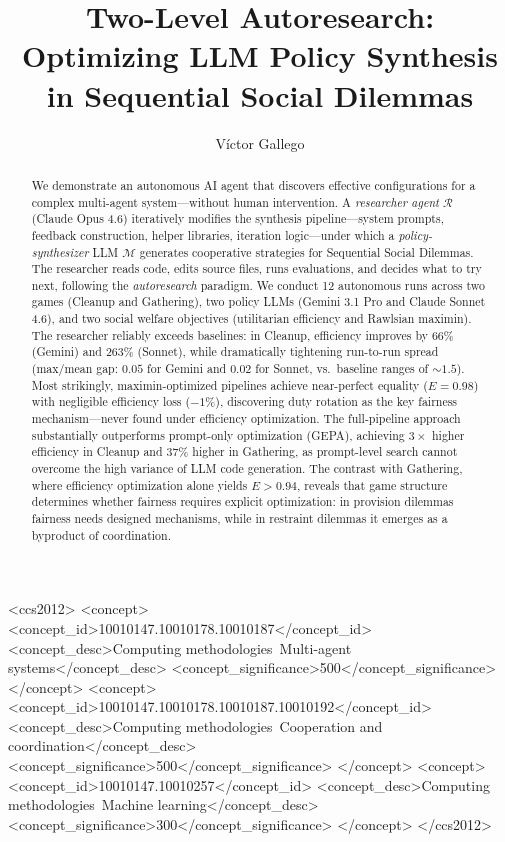 \documentclass[sigconf,authordraft]{acmart}
\newcommand{\cR}{\mathcal{R}}
\newcommand{\cM}{\mathcal{M}}
\begin{document}
\title{Two-Level Autoresearch: Optimizing LLM Policy Synthesis in Sequential Social Dilemmas}

\author{V\'ictor Gallego}

\renewcommand{\shortauthors}{Gallego}

\begin{abstract}
We demonstrate an autonomous AI agent that discovers effective configurations for a complex multi-agent system---without human intervention. A \emph{researcher agent} $\cR$ (Claude Opus 4.6) iteratively modifies the synthesis pipeline---system prompts, feedback construction, helper libraries, iteration logic---under which a \emph{policy-synthesizer} LLM $\cM$ generates cooperative strategies for Sequential Social Dilemmas. The researcher reads code, edits source files, runs evaluations, and decides what to try next, following the \emph{autoresearch} paradigm. We conduct 12 autonomous runs across two games (Cleanup and Gathering), two policy LLMs (Gemini 3.1 Pro and Claude Sonnet 4.6), and two social welfare objectives (utilitarian efficiency and Rawlsian maximin). The researcher reliably exceeds baselines: in Cleanup, efficiency improves by 66\% (Gemini) and 263\% (Sonnet), while dramatically tightening run-to-run spread (max/mean gap: $0.05$ for Gemini and $0.02$ for Sonnet, vs.\ baseline ranges of ${\sim}1.5$). Most strikingly, maximin-optimized pipelines achieve near-perfect equality ($E{=}0.98$) with negligible efficiency loss ($-1\%$), discovering duty rotation as the key fairness mechanism---never found under efficiency optimization. The full-pipeline approach substantially outperforms prompt-only optimization (GEPA), achieving $3{\times}$ higher efficiency in Cleanup and $37\%$ higher in Gathering, as prompt-level search cannot overcome the high variance of LLM code generation. The contrast with Gathering, where efficiency optimization alone yields $E{>}0.94$, reveals that game structure determines whether fairness requires explicit optimization: in provision dilemmas fairness needs designed mechanisms, while in restraint dilemmas it emerges as a byproduct of coordination.
\end{abstract}

\begin{CCSXML}
<ccs2012>
 <concept>
  <concept_id>10010147.10010178.10010187</concept_id>
  <concept_desc>Computing methodologies~Multi-agent systems</concept_desc>
  <concept_significance>500</concept_significance>
 </concept>
 <concept>
  <concept_id>10010147.10010178.10010187.10010192</concept_id>
  <concept_desc>Computing methodologies~Cooperation and coordination</concept_desc>
  <concept_significance>500</concept_significance>
 </concept>
 <concept>
  <concept_id>10010147.10010257</concept_id>
  <concept_desc>Computing methodologies~Machine learning</concept_desc>
  <concept_significance>300</concept_significance>
 </concept>
</ccs2012>
\end{CCSXML}
\end{document}
